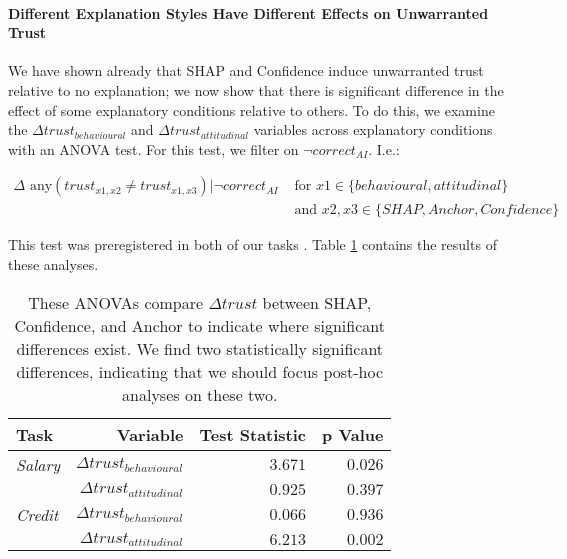 \paragraph{Different Explanation Styles Have Different Effects on Unwarranted Trust}
We have shown already that SHAP and Confidence induce unwarranted trust relative to no explanation; we now show that there is significant difference in the effect of some explanatory conditions relative to others. To do this, we examine the $\Delta trust_{behavioural}$ and $\Delta trust_{attitudinal}$ variables across explanatory conditions with an ANOVA test. For this test, we filter on $\neg correct_{AI}$. I.e.:

\begin{equation}
    \begin{split}
        \Delta \text{ any}(trust_{x1,x2} \neq trust_{x1,x3}) | \neg correct_{AI} & \text{ for } x1 \in \{behavioural, attitudinal\} \\
        & \text{ and } x2,x3 \in \{SHAP, Anchor, Confidence\}
    \end{split}
\end{equation}

\noindent This test was preregistered in both of our tasks \cite{natarajan_binns_2022}. Table \ref{tab:delta-trust-anova} contains the results of these analyses.

\begin{table}[htb]
    \centering
    \caption{These ANOVAs compare $\Delta trust$ between SHAP, Confidence, and Anchor to indicate where significant differences exist. We find two statistically significant differences, indicating that we should focus post-hoc analyses on these two.}
    \label{tab:delta-trust-anova}
    \begin{tabular}{lrrr}
        \toprule
        Task & Variable & Test Statistic & p Value \\
        \midrule
        \emph{Salary} & $\Delta trust_{behavioural}$ & $\mathbf{3.671}$ & $\mathbf{0.026}$ \\
        & $\Delta trust_{attitudinal}$ & $0.925$ & $0.397$ \\
        \midrule
        \emph{Credit} & $\Delta trust_{behavioural}$ & $0.066$ & $0.936$ \\
        & $\Delta trust_{attitudinal}$ & $\mathbf{6.213}$ & $\mathbf{0.002}$ \\
        \bottomrule
    \end{tabular}
\end{table}

